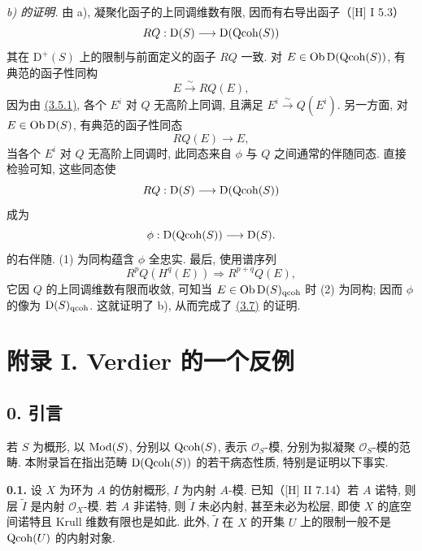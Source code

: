\emph{b) 的证明.} 由 a), 凝聚化函子的上同调维数有限, 因而有右导出函子（[H] I 5.3）
\[
 RQ:\mathrm D(S)\longrightarrow\mathrm D(\operatorname{Qcoh}(S))
\]
其在 $\mathrm D^+(S)$ 上的限制与前面定义的函子 $RQ$ 一致. 对 $E\in\operatorname{Ob}\mathrm D(\operatorname{Qcoh}(S))$, 有典范的函子性同构
\begin{equation}\tag{1}
 E\xrightarrow{\sim}RQ(E),
\end{equation}
因为由 \hyperlink{sga6.e02.prop.3-5}{(3.5.1)}, 各个 $E^i$ 对 $Q$ 无高阶上同调, 且满足 $E^i\xrightarrow{\sim}Q(E^i)$. 另一方面, 对 $E\in\operatorname{Ob}\mathrm D(S)$, 有典范的函子性同态
\begin{equation}\tag{2}
 RQ(E)\longrightarrow E,
\end{equation}
当各个 $E^i$ 对 $Q$ 无高阶上同调时, 此同态来自 $\phi$ 与 $Q$ 之间通常的伴随同态. 直接检验可知, 这些同态使
\[
 RQ:\mathrm D(S)\longrightarrow\mathrm D(\operatorname{Qcoh}(S))
\]
成为
\[
 \phi:\mathrm D(\operatorname{Qcoh}(S))\longrightarrow\mathrm D(S).
\]
的右伴随. (1) 为同构蕴含 $\phi$ 全忠实. 最后, 使用谱序列
\[
 R^pQ(H^q(E))\Longrightarrow R^{p+q}Q(E),
\]
它因 $Q$ 的上同调维数有限而收敛, 可知当 $E\in\operatorname{Ob}\mathrm D(S)_{\mathrm{qcoh}}$ 时 (2) 为同构; 因而 $\phi$ 的像为 $\mathrm D(S)_{\mathrm{qcoh}}$. 这就证明了 b), 从而完成了 \hyperlink{sga6.e02.prop.3-7}{(3.7)} 的证明.

\section*{附录 I. Verdier 的一个反例\protect\footnotemark}

\subsection*{0. 引言}
若 $S$ 为概形, 以 $\operatorname{Mod}(S)$, 分别以 $\operatorname{Qcoh}(S)$, 表示 $\mathcal O_S$-模, 分别为拟凝聚 $\mathcal O_S$-模的范畴. 本附录旨在指出范畴 $\mathrm D(\operatorname{Qcoh}(S))$ 的若干病态性质, 特别是证明以下事实.

\textbf{0.1.} 设 $X$ 为环为 $A$ 的仿射概形, $I$ 为内射 $A$-模. 已知（[H] II 7.14）若 $A$ 诺特, 则层 $\widetilde I$ 是内射 $\mathcal O_X$-模. 若 $A$ 非诺特, 则 $\widetilde I$ 未必内射, 甚至未必为松层, 即使 $X$ 的底空间诺特且 Krull 维数有限也是如此. 此外, $\widetilde I$ 在 $X$ 的开集 $U$ 上的限制一般不是 $\operatorname{Qcoh}(U)$ 的内射对象.

